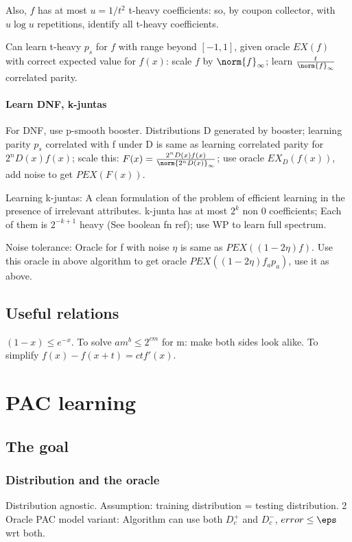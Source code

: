 \documentclass[oneside, article]{memoir}
\begin{document}
Also, $f$ has at most $u = 1/t^2$ t-heavy coefficients: so, by coupon collector, with $u \log u$ repetitions, identify all t-heavy coefficients.

Can learn t-heavy $p_s$ for $f$ with range beyond $[-1,1]$, given oracle $EX(f)$ with correct expected value for $f(x)$: scale $f$ by $\norm{f}_{\infty}$; learn $\frac{t}{\norm{f}_{\infty}}$ correlated parity.

\subsubsection{Learn DNF, k-juntas}
For DNF, use p-smooth booster. Distributions D generated by booster; learning parity $p_s$ correlated with f under D is same as learning correlated parity for $2^{n}D(x)f(x)$; scale this: $F(x) = \frac{2^{n}D(x)f(x)}{\norm{2^{n}D(x)}_{\infty}}$; use oracle $EX_{D}(f(x))$, add noise to get $PEX(F(x))$.

Learning k-juntas: A clean formulation of the problem of efficient learning in the presence of irrelevant attributes. k-junta has at most $2^k$ non 0 coefficients; Each of them is $2^{-k+1}$ heavy (See boolean fn ref); use WP to learn full spectrum.

Noise tolerance: Oracle for f with noise $\eta$ is same as $PEX((1-2\eta)f)$. Use this oracle in above algorithm to get oracle $PEX((1-2\eta)f_a p_a)$, use it as above.

\section{Useful relations} $(1-x) \leq e^{-x}$. To solve $am^{b} \leq 2^{cm}$ for m: make both sides look alike. To simplify $f(x)-f(x+t) = ctf'(x)$.

\chapter{PAC learning}
\section{The goal}
\subsection{Distribution and the oracle}
Distribution agnostic. Assumption: training distribution = testing distribution. 2 Oracle PAC model variant: Algorithm can use both $D^{+}_{c}$ and $D^{-}_{c}$, $error \leq \eps$ wrt both.
\end{document}
